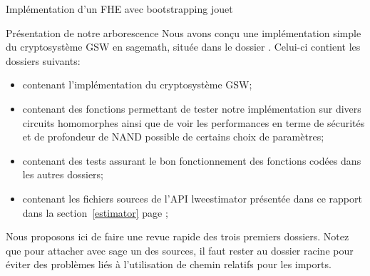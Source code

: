 \begin{section}{Implémentation d'un FHE avec bootstrapping \og{}jouet\fg~{}}
\begin{subsection}{Présentation de notre arborescence}
Nous avons conçu une implémentation simple du cryptosystème GSW en sagemath, située dans le dossier
. Celui-ci contient les  dossiers suivants:
\begin{itemize}
\item {} contenant l'implémentation du cryptosystème GSW;
\item {} contenant des fonctions permettant 
	de tester notre implémentation sur divers circuits homomorphes ainsi que de voir les performances en terme
	de sécurités et de profondeur de NAND possible de certains choix de paramètres;
\item {} contenant des tests assurant le bon fonctionnement
	des fonctions codées dans les autres dossiers; 
\item {} contenant les fichiers sources de l'API
	 lwe\textunderscore estimator présentée dans ce rapport dans la section~\ref{estimator} page \pageref{estimator}; 
\end{itemize}

Nous proposons ici de faire une revue rapide des trois premiers dossiers. Notez que pour
attacher avec sage un des sources, il faut rester au dossier racine pour
éviter des problèmes liés à l'utilisation de chemin relatifs pour les imports.



\end{subsection}
\end{section}
